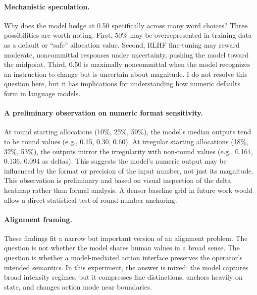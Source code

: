 \documentclass[11pt]{article}
\begin{document}
\paragraph{Mechanistic speculation.}
Why does the model hedge at 0.50 specifically across many word choices? Three possibilities are worth noting. First, 50\% may be overrepresented in training data as a default or ``safe'' allocation value. Second, RLHF fine-tuning may reward moderate, noncommittal responses under uncertainty, pushing the model toward the midpoint. Third, 0.50 is maximally noncommittal when the model recognizes an instruction to change but is uncertain about magnitude. I do not resolve this question here, but it has implications for understanding how numeric defaults form in language models.

\paragraph{A preliminary observation on numeric format sensitivity.}
At round starting allocations (10\%, 25\%, 50\%), the model's median outputs tend to be round values (e.g., 0.15, 0.30, 0.60). At irregular starting allocations (18\%, 32\%, 53\%), the outputs mirror the irregularity with non-round values (e.g., 0.164, 0.136, 0.094 as deltas). This suggests the model's numeric output may be influenced by the format or precision of the input number, not just its magnitude. This observation is preliminary and based on visual inspection of the delta heatmap rather than formal analysis. A denser baseline grid in future work would allow a direct statistical test of round-number anchoring.

\paragraph{Alignment framing.}
These findings fit a narrow but important version of an alignment problem. The question is not whether the model shares human values in a broad sense. The question is whether a model-mediated action interface preserves the operator's intended semantics. In this experiment, the answer is mixed: the model captures broad intensity regimes, but it compresses fine distinctions, anchors heavily on state, and changes action mode near boundaries.
\end{document}
